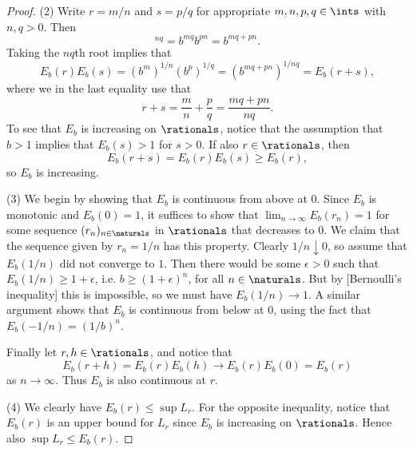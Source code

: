 \documentclass[article, a4paper, 11pt, oneside]{memoir}
\numberwithin{equation}{chapter}
\begin{document}
\begin{proof}
    (2) Write $r = m/n$ and $s = p/q$ for appropriate $m,n,p,q \in \ints$ with $n,q > 0$. Then
    \begin{equation*}
        [ (b^m)^{1/n} (b^p)^{1/q} ]^{nq}
            = b^{mq} b^{pn}
            = b^{mq + pn}.
    \end{equation*}
    Taking the $nq$th root implies that
    \begin{equation*}
        E_b(r) E_b(s)
            = (b^m)^{1/n} (b^p)^{1/q}
            = (b^{mq+pn})^{1/nq}
            = E_b(r + s),
    \end{equation*}
    where we in the last equality use that
    \begin{equation*}
        r + s
            = \frac{m}{n} + \frac{p}{q}
            = \frac{mq + pn}{nq}.
    \end{equation*}
    To see that $E_b$ is increasing on $\rationals$, notice that the assumption that $b > 1$ implies that $E_b(s) > 1$ for $s > 0$. If also $r \in \rationals$, then
    \begin{equation*}
        E_b(r + s)
            = E_b(r) E_b(s)
            \geq E_b(r),
    \end{equation*}
    so $E_b$ is increasing.
    
    (3) We begin by showing that $E_b$ is continuous from above at $0$. Since $E_b$ is monotonic and $E_b(0) = 1$, it suffices to show that $\lim_{n\to\infty} E_b(r_n) = 1$ for some sequence $(r_n)_{n\in\naturals}$ in $\rationals$ that decreases to $0$. We claim that the sequence given by $r_n = 1/n$ has this property. Clearly $1/n \downarrow 0$, so assume that $E_b(1/n)$ did not converge to $1$. Then there would be some $\epsilon > 0$ such that $E_b(1/n) \geq 1 + \epsilon$, i.e. $b \geq (1 + \epsilon)^n$, for all $n \in \naturals$. But by [Bernoulli's inequality] this is impossible, so we must have $E_b(1/n) \to 1$. A similar argument shows that $E_b$ is continuous from below at $0$, using the fact that $E_b(-1/n) = (1/b)^n$.

    Finally let $r,h \in \rationals$, and notice that
    \begin{equation*}
        E_b(r+h)
            = E_b(r) E_b(h)
            \to E_b(r) E_b(0)
            = E_b(r)
    \end{equation*}
    as $n \to \infty$. Thus $E_b$ is also continuous at $r$.

    (4) We clearly have $E_b(r) \leq \sup L_r$. For the opposite inequality, notice that $E_b(r)$ is an upper bound for $L_r$ since $E_b$ is increasing on $\rationals$. Hence also $\sup L_r \leq E_b(r)$.


\end{proof}
\end{document}
